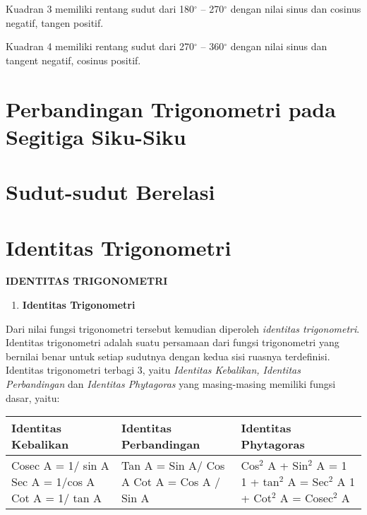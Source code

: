 \documentclass[11pt,fleqn]{book} %
\begin{document}
\noindent Kuadran 3 memiliki rentang sudut dari 180${}^\circ$ -- 270${}^\circ$ dengan nilai sinus dan cosinus negatif, tangen positif.

\noindent Kuadran 4 memiliki rentang sudut dari 270${}^\circ$ -- 360${}^\circ$ dengan nilai sinus dan tangent negatif, cosinus positif.

\noindent 

\noindent 


\section{Perbandingan Trigonometri pada Segitiga Siku-Siku}

\section{Sudut-sudut Berelasi}


\section{Identitas Trigonometri}

\noindent \textbf{IDENTITAS TRIGONOMETRI}

\begin{enumerate}
\item \textbf{ Identitas Trigonometri}
\end{enumerate}

Dari nilai fungsi trigonometri tersebut kemudian diperoleh \textit{identitas trigonometri}. Identitas trigonometri adalah suatu persamaan dari fungsi trigonometri yang bernilai benar untuk setiap sudutnya dengan kedua sisi ruasnya terdefinisi. Identitas trigonometri terbagi 3, yaitu \textit{Identitas Kebalikan, Identitas Perbandingan }dan\textit{ Identitas Phytagoras} yang masing-masing memiliki fungsi dasar, yaitu:

\begin{tabular}{|p{1.8in}|p{1.9in}|p{1.8in}|} \hline 
Identitas Kebalikan & Identitas Perbandingan & Identitas Phytagoras \\ \hline 
Cosec A = 1/ sin A Sec A = 1/cos A Cot A = 1/ tan A & Tan A = Sin A/ Cos A Cot A = Cos A / Sin A  & Cos${}^{2}$ A + Sin${}^{2}$ A = 1 1 + tan${}^{2}$ A = Sec${}^{2}$ A 1 + Cot${}^{2}$ A = Cosec${}^{2}$ A \\ \hline 
\end{tabular}
\end{document}

